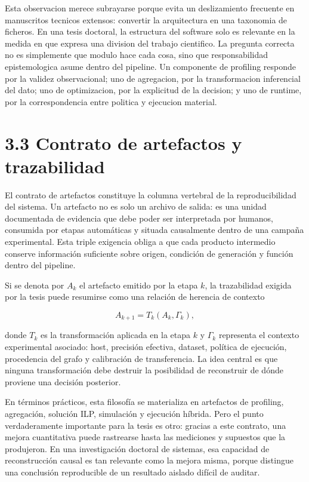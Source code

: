 Esta observacion merece subrayarse porque evita un deslizamiento frecuente en manuscritos tecnicos extensos: convertir la arquitectura en una taxonomia de ficheros. En una tesis doctoral, la estructura del software solo es relevante en la medida en que expresa una division del trabajo cientifico. La pregunta correcta no es simplemente que modulo hace cada cosa, sino que responsabilidad epistemologica asume dentro del pipeline. Un componente de profiling responde por la validez observacional; uno de agregacion, por la transformacion inferencial del dato; uno de optimizacion, por la explicitud de la decision; y uno de runtime, por la correspondencia entre politica y ejecucion material.

\section{3.3 Contrato de artefactos y trazabilidad}
El contrato de artefactos constituye la columna vertebral de la reproducibilidad del sistema. Un artefacto no es solo un archivo de salida: es una unidad documentada de evidencia que debe poder ser interpretada por humanos, consumida por etapas automáticas y situada causalmente dentro de una campaña experimental. Esta triple exigencia obliga a que cada producto intermedio conserve información suficiente sobre origen, condición de generación y función dentro del pipeline.

Si se denota por $A_k$ el artefacto emitido por la etapa $k$, la trazabilidad exigida por la tesis puede resumirse como una relación de herencia de contexto

$$
A_{k+1} = T_k(A_k, \Gamma_k),
$$

donde $T_k$ es la transformación aplicada en la etapa $k$ y $\Gamma_k$ representa el contexto experimental asociado: host, precisión efectiva, dataset, política de ejecución, procedencia del grafo y calibración de transferencia. La idea central es que ninguna transformación debe destruir la posibilidad de reconstruir de dónde proviene una decisión posterior.

En términos prácticos, esta filosofía se materializa en artefactos de profiling, agregación, solución ILP, simulación y ejecución híbrida. Pero el punto verdaderamente importante para la tesis es otro: gracias a este contrato, una mejora cuantitativa puede rastrearse hasta las mediciones y supuestos que la produjeron. En una investigación doctoral de sistemas, esa capacidad de reconstrucción causal es tan relevante como la mejora misma, porque distingue una conclusión reproducible de un resultado aislado difícil de auditar.

